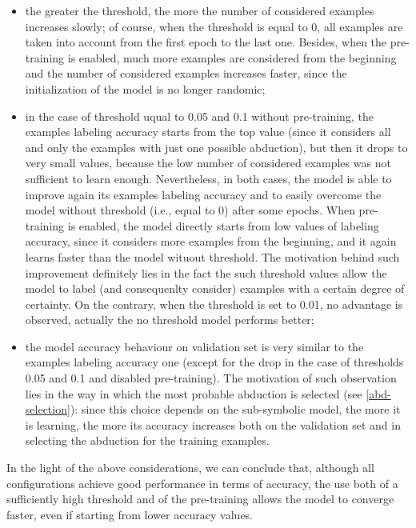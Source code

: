 \begin{itemize}
	\item the greater the threshold, the more the number of considered examples increases slowly; of course, when the threshold is equal to 0, all examples are taken into account from the first epoch to the last one. Besides, when the pre-training is enabled, much more examples are considered from the beginning and the number of considered examples increases faster, since the initialization of the model is no longer randomic;
	\item in the case of threshold uqual to 0.05 and 0.1 without pre-training, the examples labeling accuracy starts from the top value (since it considers all and only the examples with just one possible abduction), but then it drops to very small values, because the low number of considered examples was not sufficient to learn enough. Nevertheless, in both cases, the model is able to improve again its examples labeling accuracy and to easily overcome the model without threshold (i.e., equal to 0) after some epochs. When pre-training is enabled, the model directly starts from low values of labeling accuracy, since it considers more examples from the beginning, and it again learns faster than the model wituout threshold. The motivation behind such improvement definitely lies in the fact the such threshold values allow the model to label (and consequenlty consider) examples with a certain degree of certainty. On the contrary, when the threshold is set to 0.01, no advantage is observed, actually the no threshold model performs better;
	\item the model accuracy behaviour on validation set is very similar to the examples labeling accuracy one (except for the drop in the case of thresholds 0.05 and 0.1 and disabled pre-training). The motivation of such observation lies in the way in which the most probable abduction is selected (see \ref{abd-selection}): since this choice depends on the sub-symbolic model, the more it is learning, the more its accuracy increases both on the validation set and in selecting the abduction for the training examples.
\end{itemize}
In the light of the above considerations, we can conclude that, although all configurations achieve good performance in terms of accuracy, the use both of a sufficiently high threshold and of the pre-training allows the model to converge faster, even if starting from lower accuracy values.

